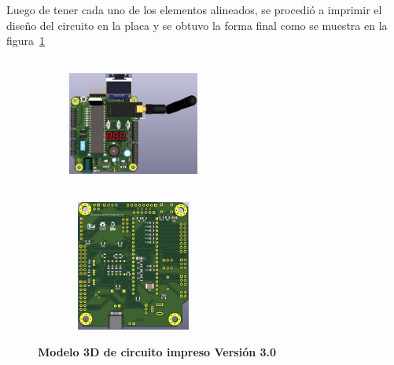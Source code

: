 \documentclass[times, 10pt,twocolumn]{article}
\begin{document}
Luego de tener cada uno de los elementos alineados, se procedió a imprimir el diseño del circuito en la placa y se obtuvo la forma final como se muestra en la figura~\ref{fig:11}

\begin{figure}[htbp]
  \begin{subfigure}[b]{0.4\columnwidth}
     \includegraphics[width=4.3cm, height=4.3cm]{Img/tercera_version_3d.png}
  \end{subfigure}
   \hspace{0.7cm}
  \begin{subfigure}[b]{0.4\columnwidth}
    \includegraphics[width=4.3cm, height=4.3cm]{Img/tercera_version_pcb_b.png}
  \end{subfigure}
   \caption{\centering \textbf{Modelo 3D de circuito impreso Versión 3.0}} 
   \label{fig:11}
 \end{figure}
\end{document}
